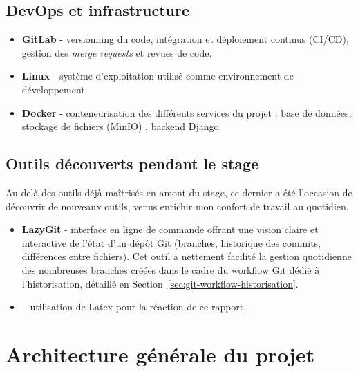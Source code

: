 \subsection{DevOps et infrastructure}
\begin{itemize}
  \item \textbf{GitLab}   -  versionning du
        code, intégration et déploiement continus (CI/CD), gestion des
        \textit{merge requests} et revues de code.
  \item \textbf{Linux}   -  système
        d'exploitation utilisé comme environnement de développement.
  \item \textbf{Docker}   -  conteneurisation
        des différents services du projet : base de données, stockage de
        fichiers (MinIO) , backend Django.
\end{itemize}

\subsection{Outils découverts pendant le stage}

Au-delà des outils déjà maîtrisés en amont du stage, ce dernier a été
l'occasion de découvrir de nouveaux outils, venus enrichir mon confort de
travail au quotidien.

\begin{itemize}
  \item \textbf{LazyGit}   -  interface en
        ligne de commande offrant une vision claire et interactive de
        l'état d'un dépôt Git (branches, historique des commits,
        différences entre fichiers). Cet outil a nettement facilité la
        gestion quotidienne des nombreuses branches créées dans le cadre
        du workflow Git dédié à l'historisation, détaillé en
        Section~\ref{sec:git-workflow-historisation}.
\end{itemize}

\begin{itemize}
  \item \  utilisation de Latex pour la réaction de ce rapport.
\end{itemize}

\section{Architecture générale du projet}

